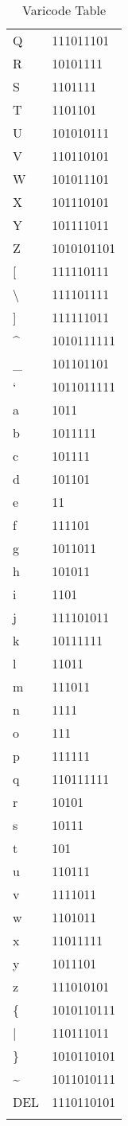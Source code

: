 \begin{longtable}{ l l }
			Q   & 111011101 \\
			R   & 10101111 \\
			S   & 1101111 \\
			T   & 1101101 \\
			U   & 101010111 \\
			V   & 110110101 \\
			W   & 101011101 \\
			X   & 101110101 \\
			Y   & 101111011 \\
			Z   & 1010101101 \\
			{[}   & 111110111 \\
			\textbackslash  & 111101111 \\
			{]}   & 111111011 \\
			\textasciicircum   & 1010111111 \\
			\_   & 101101101 \\
			`   & 1011011111 \\
			a   & 1011 \\
			b   & 1011111 \\
			c   & 101111 \\
			d   & 101101 \\
			e   & 11 \\
			f   & 111101 \\
			g   & 1011011 \\
			h   & 101011 \\
			i   & 1101 \\
			j   & 111101011 \\
			k   & 10111111 \\
			l   & 11011 \\
			m   & 111011 \\
			n   & 1111 \\
			o   & 111 \\
			p   & 111111 \\
			q   & 110111111 \\
			r   & 10101 \\
			s   & 10111 \\
			t   & 101 \\
			u   & 110111 \\
			v   & 1111011 \\
			w   & 1101011 \\
			x   & 11011111 \\
			y   & 1011101 \\
			z   & 111010101 \\
			\{   & 1010110111 \\
			|   & 110111011 \\
			\}   & 1010110101 \\
			\textasciitilde   & 1011010111 \\
			DEL & 1110110101\\\hline
			\caption{Varicode Table}
			\label{tab:psk31_varicode}
		\end{longtable}

